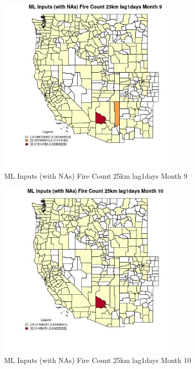 \begin{figure} 
\centering  
\includegraphics[width=0.77\textwidth]{Code_Outputs/Report_ML_input_PM25_Step4_part_e_de_duplicated_aves_compiled_2019-05-21wNAs_CountyFire_Count_25km_lag1daysmedianMonth9.jpg} 
\caption{\label{fig:Report_ML_input_PM25_Step4_part_e_de_duplicated_aves_compiled_2019-05-21wNAsCountyFire_Count_25km_lag1daysmedianMonth9}ML Inputs (with NAs) Fire Count 25km lag1days Month 9} 
\end{figure} 
 

\begin{figure} 
\centering  
\includegraphics[width=0.77\textwidth]{Code_Outputs/Report_ML_input_PM25_Step4_part_e_de_duplicated_aves_compiled_2019-05-21wNAs_CountyFire_Count_25km_lag1daysmedianMonth10.jpg} 
\caption{\label{fig:Report_ML_input_PM25_Step4_part_e_de_duplicated_aves_compiled_2019-05-21wNAsCountyFire_Count_25km_lag1daysmedianMonth10}ML Inputs (with NAs) Fire Count 25km lag1days Month 10} 
\end{figure} 
 

